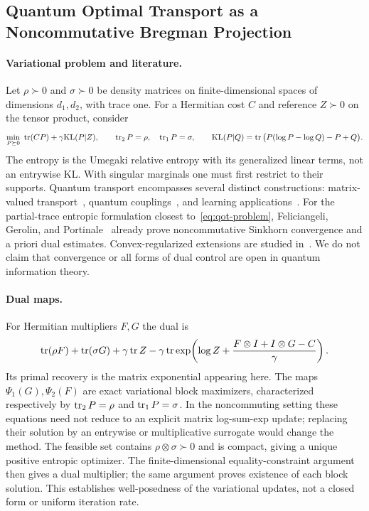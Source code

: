 \subsection{Quantum Optimal Transport as a Noncommutative Bregman Projection}\label{app-app:quantum-ot}
\paragraph{Variational problem and literature.}
Let $\rho\succ0$ and $\sigma\succ0$ be density matrices on finite-dimensional spaces of dimensions $d_1,d_2$, with trace one. For a Hermitian cost $C$ and reference $Z\succ0$ on the tensor product, consider
\begin{equation}\label{eq:qot-problem}
 \min_{P\succeq0}\ \operatorname{tr}(CP)+\gamma\mathrm{KL}(P|Z),\qquad
 \operatorname{tr}_2P=\rho,\quad \operatorname{tr}_1P=\sigma,
 \qquad
 \mathrm{KL}(P|Q)=\operatorname{tr}\big(P(\log P-\log Q)-P+Q\big).
\end{equation}
The entropy is the Umegaki relative entropy with its generalized linear terms, not an entrywise KL. With singular marginals one must first restrict to their supports. Quantum transport encompasses several distinct constructions: matrix-valued transport~\citep{ning2014matrix,peyre2019quantum}, quantum couplings~\citep{golse2016mean,caglioti2019quantum}, and learning applications~\citep{chakrabarti2019quantum}. For the partial-trace entropic formulation closest to~\eqref{eq:qot-problem}, Feliciangeli, Gerolin, and Portinale~\citep{feliciangeli2021noncommutative} already prove noncommutative Sinkhorn convergence and a priori dual estimates. Convex-regularized extensions are studied in~\citep{caputo2024quantum}. We do not claim that convergence or all forms of dual control are open in quantum information theory.

\paragraph{Dual maps.}
For Hermitian multipliers $F,G$ the dual is
\begin{equation}\label{eq:qot-dual}
 \operatorname{tr}(\rho F)+\operatorname{tr}(\sigma G)+\gamma\operatorname{tr} Z
 -\gamma\operatorname{tr}\exp\!\left(\log Z+
 \frac{F\otimes I+I\otimes G-C}{\gamma}\right).
\end{equation}
Its primal recovery is the matrix exponential appearing here. The maps $\Psi_1(G),\Psi_2(F)$ are exact variational block maximizers, characterized respectively by $\operatorname{tr}_2P=\rho$ and $\operatorname{tr}_1P=\sigma$. In the noncommuting setting these equations need not reduce to an explicit matrix log-sum-exp update; replacing their solution by an entrywise or multiplicative surrogate would change the method. The feasible set contains $\rho\otimes\sigma\succ0$ and is compact, giving a unique positive entropic optimizer. The finite-dimensional equality-constraint argument then gives a dual multiplier; the same argument proves existence of each block solution. This establishes well-posedness of the variational updates, not a closed form or uniform iteration rate.


